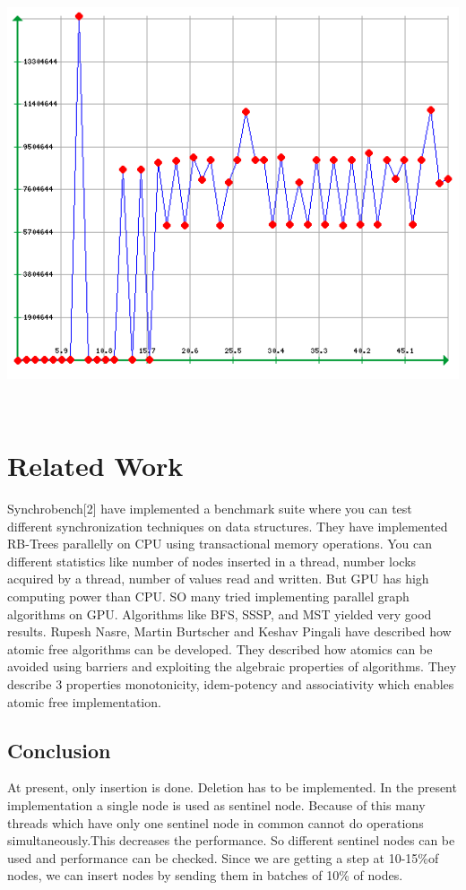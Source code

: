 \documentclass[BTech]{iitmdiss}
\begin{document}
\centerline{\includegraphics{Graph_gpu.png}}\\

\chapter{Related Work}
Synchrobench[2] have implemented a benchmark suite where you can test different synchronization techniques on data structures. They have implemented RB-Trees parallelly on CPU using transactional memory operations. You can different statistics like number of nodes inserted in a thread, number locks acquired by a thread, number of values read and written. But GPU has high computing power than CPU. SO many tried implementing parallel graph algorithms on GPU. Algorithms like BFS, SSSP, and MST yielded very good results. 
Rupesh Nasre, Martin Burtscher and Keshav Pingali have described how atomic free algorithms can be developed. They described how atomics can be avoided using barriers and exploiting the algebraic properties of algorithms. They describe 3 properties monotonicity, idem-potency and associativity which enables atomic free implementation.
\section{Conclusion}
At present, only insertion is done. Deletion has to be implemented. In the present implementation a single node is used as sentinel node. Because of this many threads which have only one sentinel node in common cannot do operations simultaneously.This decreases the performance. So different sentinel nodes can be used and performance can be checked. Since we are getting a step at 10-15\%of nodes, we can insert nodes by sending them in batches of 10\% of nodes.
\end{document}
